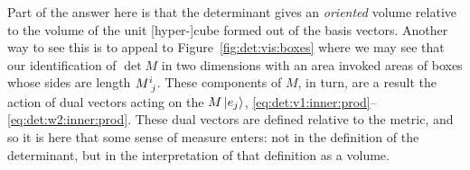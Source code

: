 Part of the answer here is that the determinant gives an \emph{oriented} volume relative to the volume of the unit [hyper-]cube formed out of the basis vectors. Another way to see this is to appeal to Figure~\ref{fig:det:vis:boxes} where we may see that our identification of $\det M$ in two dimensions with an area invoked areas of boxes whose sides are length $M\aij{i}{j}$. These components of $M$, in turn, are a result the action of dual vectors acting on the $M\left|e_j\right\rangle$, \eqref{eq:det:v1:inner:prod}--\eqref{eq:det:w2:inner:prod}. These dual vectors are defined relative to the metric, and so it is here that some sense of measure enters: not in the definition of the determinant, but in the interpretation of that definition as a volume.

